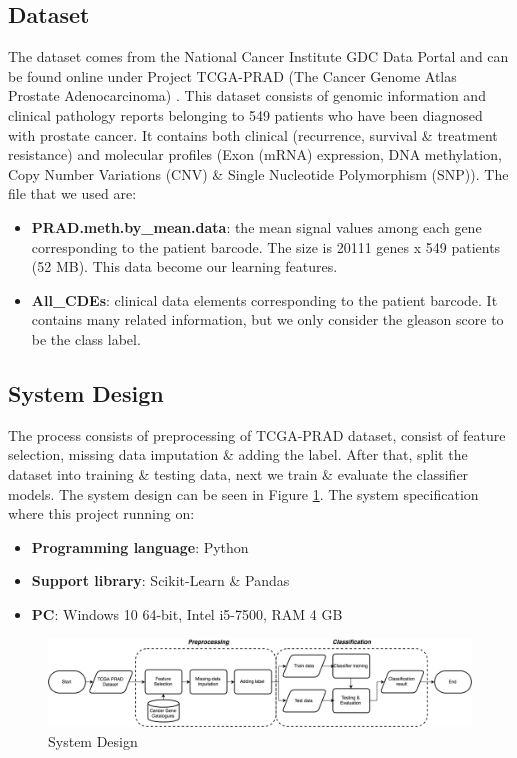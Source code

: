 \documentclass[a4paper,oneside]{article}
\begin{document}
\subsection{Dataset}
The dataset comes from the National Cancer Institute GDC Data Portal and can be found online under Project TCGA-PRAD (The Cancer Genome Atlas Prostate Adenocarcinoma) \cite{praddata}. This dataset consists of genomic information and clinical pathology reports belonging to 549 patients who have been diagnosed with prostate cancer. It contains both clinical (recurrence, survival \& treatment resistance) and molecular profiles (Exon (mRNA) expression, DNA methylation, Copy Number Variations (CNV) \& Single Nucleotide Polymorphism (SNP)). The file that we used are:
\begin{itemize}
\item \textbf{PRAD.meth.by\_mean.data}: the mean signal values among each gene corresponding to the patient barcode. The size is 20111 genes x 549 patients (52 MB). This data become our learning features.
\item \textbf{All\_CDEs}: clinical data elements corresponding to the patient barcode. It contains many related information, but we only consider the gleason score to be the class label.
\end{itemize}

\subsection{System Design}
The process consists of preprocessing of TCGA-PRAD dataset, consist of feature selection, missing data imputation \& adding the label. After that, split the dataset into training \& testing data, next we train \& evaluate the classifier models. The system design can be seen in Figure \ref{fig:system_design}. The system specification where this project running on:
\begin{itemize}
\item \textbf{Programming language}: Python
\item \textbf{Support library}: Scikit-Learn \& Pandas
\item \textbf{PC}: Windows 10 64-bit, Intel i5-7500, RAM 4 GB
\end{itemize}

\begin{figure}
  \includegraphics[width=1\linewidth]{system_design}
  \centering
  \caption{System Design}
  \label{fig:system_design}
\end{figure}
\end{document}
